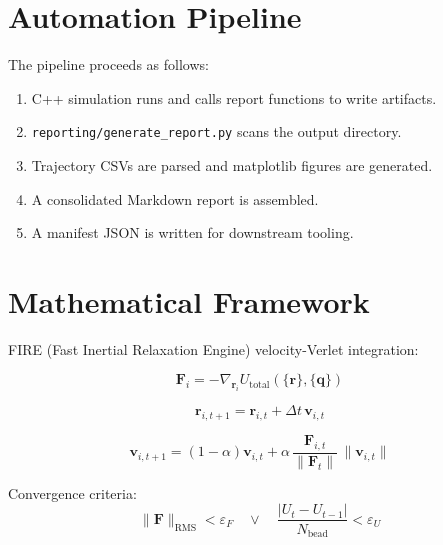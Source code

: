 \documentclass[11pt]{article}
\begin{document}
\section{Automation Pipeline}

The pipeline proceeds as follows:

\begin{enumerate}
  \item C++ simulation runs and calls report functions to write artifacts.
  \item \texttt{reporting/generate\_report.py} scans the output directory.
  \item Trajectory CSVs are parsed and matplotlib figures are generated.
  \item A consolidated Markdown report is assembled.
  \item A manifest JSON is written for downstream tooling.
\end{enumerate}

\section{Mathematical Framework}

FIRE (Fast Inertial Relaxation Engine) velocity-Verlet integration:

\begin{equation}
  \mathbf{F}_i = -\nabla_{\mathbf{r}_i} U_{\text{total}}(\{\mathbf{r}\}, \{\mathbf{q}\})
\end{equation}

\begin{equation}
  \mathbf{r}_{i,t+1} = \mathbf{r}_{i,t} + \Delta t \, \mathbf{v}_{i,t}
\end{equation}

\begin{equation}
  \mathbf{v}_{i,t+1} = (1-\alpha)\mathbf{v}_{i,t}
    + \alpha\,\frac{\mathbf{F}_{i,t}}{\|\mathbf{F}_t\|}\,\|\mathbf{v}_{i,t}\|
\end{equation}

Convergence criteria:
\begin{equation}
  \|\mathbf{F}\|_{\text{RMS}} < \varepsilon_F
  \quad \lor \quad
  \frac{|U_t - U_{t-1}|}{N_{\text{bead}}} < \varepsilon_U
\end{equation}

\end{document}
